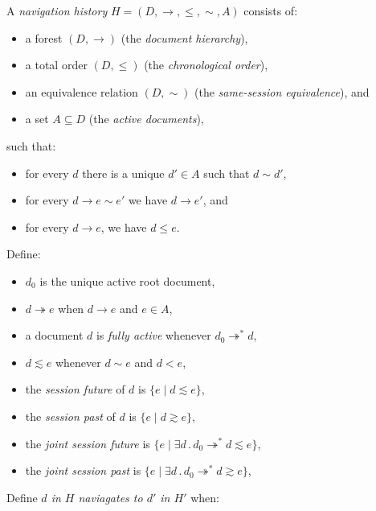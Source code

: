 \documentclass{article}
\newcommand{\aNH}{H}
\newcommand{\Docs}{D}
\newcommand{\Active}{A}
\newcommand{\parentOf}{\rightarrow}
\newcommand{\parentOfActive}{\twoheadrightarrow}
\newcommand{\leChron}{\le}
\newcommand{\ltChron}{<}
\newcommand{\eqSess}{\sim}
\newcommand{\ltSess}{\lesssim}
\newcommand{\gtSess}{\gtrsim}
\newcommand{\rootDoc}{d_0}
\newcommand{\aDoc}{d}
\newcommand{\bDoc}{e}
\newcommand{\st}{\mathbin.}
\begin{document}
A \emph{navigation history} $\aNH=(\Docs,{\parentOf},{\leChron},{\eqSess},\Active)$ consists of:
\begin{itemize}
\item a forest $(\Docs,{\parentOf})$ (the \emph{document hierarchy}),
\item a total order $(\Docs,{\leChron})$ (the \emph{chronological order}),
\item an equivalence relation $(\Docs,{\eqSess})$ (the \emph{same-session equivalence}), and
\item a set $\Active \subseteq \Docs$ (the \emph{active documents}),
\end{itemize}
such that:
\begin{itemize}
\item for every $\aDoc$ there is a unique $\aDoc'\in\Active$ such that $\aDoc \eqSess \aDoc'$,
\item for every $\aDoc \parentOf \bDoc \eqSess \bDoc'$
  we have $\aDoc \parentOf \bDoc'$, and
\item for every $\aDoc \parentOf \bDoc$, we have $\aDoc \leChron \bDoc$.
\end{itemize}
Define:
\begin{itemize}
\item $\rootDoc$ is the unique active root document,
\item $\aDoc \parentOfActive \bDoc$ when $\aDoc \parentOf \bDoc$ and $\bDoc \in \Active$,
\item a document $\aDoc$ is \emph{fully active} whenever $\rootDoc \parentOfActive^* \aDoc$,
\item $\aDoc \ltSess \bDoc$ whenever $\aDoc \eqSess \bDoc$ and $\aDoc \ltChron \bDoc$,
\item the \emph{session future} of $\aDoc$ is $\{ \bDoc \mid \aDoc \ltSess \bDoc \}$,
\item the \emph{session past} of $\aDoc$ is $\{ \bDoc \mid \aDoc \gtSess \bDoc \}$,
\item the \emph{joint session future} is $\{ \bDoc \mid \exists \aDoc \st \rootDoc \parentOfActive^* \aDoc \ltSess \bDoc \}$,
\item the \emph{joint session past} is $\{ \bDoc \mid \exists \aDoc \st \rootDoc \parentOfActive^* \aDoc \gtSess \bDoc \}$,
\end{itemize}
Define \emph{$\aDoc$ in $\aNH$ naviagates to $\aDoc'$ in $\aNH'$} when:
\end{document}
